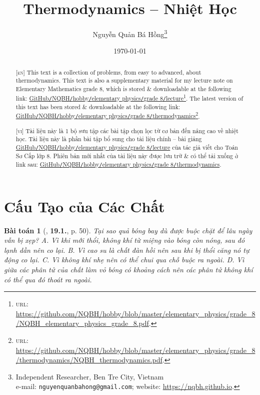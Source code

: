 \documentclass{article}
\title{Thermodynamics -- Nhiệt Học}
\author{Nguyễn Quản Bá Hồng\footnote{Independent Researcher, Ben Tre City, Vietnam\\e-mail: \texttt{nguyenquanbahong@gmail.com}; website: \url{https://nqbh.github.io}.}}
\date{\today}
\numberwithin{equation}{section}
\newtheorem{baitoan}{Bài toán}
\begin{document}
\maketitle
\begin{abstract}
	\textsc{[en]} This text is a collection of problems, from easy to advanced, about thermodynamics. This text is also a supplementary material for my lecture note on Elementary Mathematics grade 8, which is stored \& downloadable at the following link: \href{https://github.com/NQBH/hobby/blob/master/elementary_physics/grade_8/NQBH_elementary_physics_grade_8.pdf}{GitHub\texttt{/}NQBH\texttt{/}hobby\texttt{/}elementary physics\texttt{/}grade 8\texttt{/}lecture}\footnote{\textsc{url}: \url{https://github.com/NQBH/hobby/blob/master/elementary_physics/grade_8/NQBH_elementary_physics_grade_8.pdf}.}. The latest version of this text has been stored \& downloadable at the following link: \href{https://github.com/NQBH/hobby/blob/master/elementary_physics/grade_8/thermodynamics/NQBH_thermodynamics.pdf}{GitHub\texttt{/}NQBH\texttt{/}hobby\texttt{/}elementary physics\texttt{/}grade 8\texttt{/}thermodynamics}\footnote{\textsc{url}: \url{https://github.com/NQBH/hobby/blob/master/elementary_physics/grade_8/thermodynamics/NQBH_thermodynamics.pdf}.}.
	\vspace{2mm}
	
	\textsc{[vi]} Tài liệu này là 1 bộ sưu tập các bài tập chọn lọc từ cơ bản đến nâng cao về nhiệt học. Tài liệu này là phần bài tập bổ sung cho tài liệu chính -- bài giảng \href{https://github.com/NQBH/hobby/blob/master/elementary_physics/grade_8/NQBH_elementary_physics_grade_8.pdf}{GitHub\texttt{/}NQBH\texttt{/}hobby\texttt{/}elementary physics\texttt{/}grade 8\texttt{/}lecture} của tác giả viết cho Toán Sơ Cấp lớp 8. Phiên bản mới nhất của tài liệu này được lưu trữ \& có thể tải xuống ở link sau: \href{https://github.com/NQBH/hobby/blob/master/elementary_physics/grade_8/thermodynamics/NQBH_thermodynamics.pdf}{GitHub\texttt{/}NQBH\texttt{/}hobby\texttt{/}elementary physics\texttt{/}grade 8\texttt{/}thermodynamics}.
\end{abstract}
\tableofcontents
\newpage


\section{Cấu Tạo của Các Chất}

\begin{baitoan}[\cite{SBT_Vat_Ly_8}, \textbf{19.1.}, p. 50]
	Tại sao quả bóng bay dù được buộc chặt để lâu ngày vẫn bị xẹp? {\sf A.} Vì khi mới thổi, không khí từ miệng vào bóng còn nóng, sau đó lạnh dần nên co lại. {\sf B.} Vì cao su là chất đàn hồi nên sau khi bị thổi căng nó tự động co lại. {\sf C.} Vì không khí nhẹ nên có thể chui qua chỗ buộc ra ngoài. {\sf D.} Vì giữa các phân tử của chất làm vỏ bóng có khoảng cách nên các phân tử không khí có thể qua đó thoát ra ngoài.
\end{baitoan}
\end{document}
